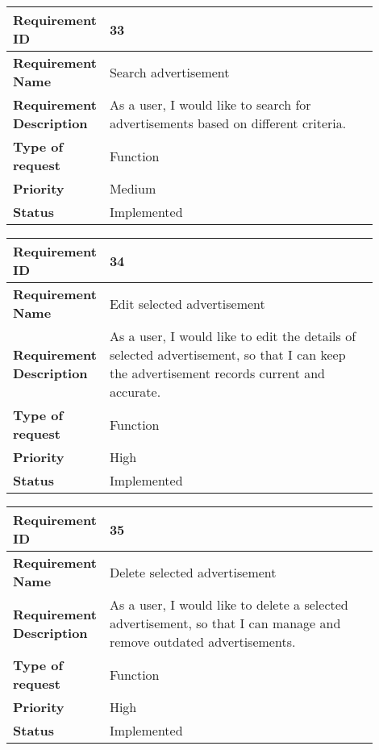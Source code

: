 \begin{table}[htbp]
\centering
\begin{tabular}{|m{0.15\linewidth}|m{0.75\linewidth}|}
\hline
\textbf{Requirement ID} & 33 \\
\hline
\textbf{Requirement Name} & Search advertisement \\
\hline
\textbf{Requirement Description} & As a user, I would like to search for advertisements based on different criteria. \\
\hline
\textbf{Type of request} & Function \\
\hline
\textbf{Priority} & Medium \\
\hline
\textbf{Status} & Implemented \\
\hline
\end{tabular}
\end{table}

\begin{table}[htbp]
\centering
\begin{tabular}{|m{0.15\linewidth}|m{0.75\linewidth}|}
\hline
\textbf{Requirement ID} & 34 \\
\hline
\textbf{Requirement Name} & Edit selected advertisement \\
\hline
\textbf{Requirement Description} & As a user, I would like to edit the details of selected advertisement, so that I can keep the advertisement records current and accurate. \\
\hline
\textbf{Type of request} & Function \\
\hline
\textbf{Priority} & High \\
\hline
\textbf{Status} & Implemented \\
\hline
\end{tabular}
\end{table}


\begin{table}[htbp]
\centering
\begin{tabular}{|m{0.15\linewidth}|m{0.75\linewidth}|}
\hline
\textbf{Requirement ID} & 35 \\
\hline
\textbf{Requirement Name} & Delete selected advertisement \\
\hline
\textbf{Requirement Description} & As a user, I would like to delete a selected advertisement, so that I can manage and remove outdated advertisements. \\
\hline
\textbf{Type of request} & Function \\
\hline
\textbf{Priority} & High \\
\hline
\textbf{Status} & Implemented \\
\hline
\end{tabular}
\end{table}










  